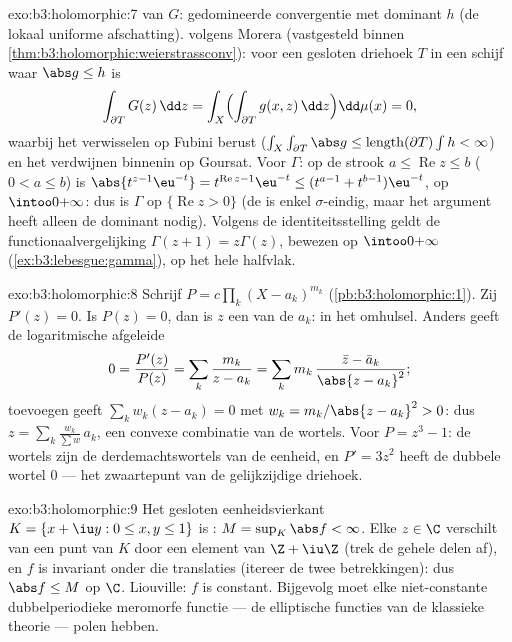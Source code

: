 \begin{solution}{exo:b3:holomorphic:7}
 van $G$: gedomineerde convergentie met dominant $h$
(de lokaal uniforme afschatting).  volgens Morera
(vastgesteld binnen
\cref{thm:b3:holomorphic:weierstrassconv}): voor een gesloten
driehoek $T$ in een schijf waar $\abs g \leq h$ is
\[
\int_{\partial T}G(z)\,\dd z =
\int_X\Bigl(\int_{\partial T}g(x, z)\,\dd z\Bigr)\dd\mu(x) =
0,
\]
waarbij het verwisselen op Fubini berust ($\int_X\int_{\partial
T}\abs g \leq \operatorname{length}(\partial T)\int h < \infty$)
en het verdwijnen binnenin op Goursat. Voor $\Gamma$: op de
strook $a \leq \operatorname{Re}z \leq b$ ($0 < a \leq b$) is
$\abs{t^{z-1}\eu^{-t}} = t^{\operatorname{Re}z-1}\eu^{-t} \leq
(t^{a-1} + t^{b-1})\eu^{-t}$,  op
$\intoo0{+\infty}$: dus is $\Gamma$  op
$\{\operatorname{Re} z > 0\}$ (de  is enkel $\sigma$-eindig,
maar het argument heeft alleen de  dominant nodig).
Volgens de identiteitsstelling geldt de functionaalvergelijking
$\Gamma(z + 1) = z\Gamma(z)$, bewezen op $\intoo0{+\infty}$
(\cref{ex:b3:lebesgue:gamma}), op het hele halfvlak.
\end{solution}

\begin{solution}{exo:b3:holomorphic:8}
Schrijf $P = c\prod_k(X - a_k)^{m_k}$
(\cref{pb:b3:holomorphic:1}). Zij $P'(z) = 0$. Is $P(z) = 0$, dan
is $z$ een van de $a_k$: in het omhulsel. Anders geeft de
logaritmische afgeleide
\[
0 = \frac{P'(z)}{P(z)} = \sum_k\frac{m_k}{z - a_k}
= \sum_k m_k\,\frac{\bar z - \bar a_k}{\abs{z - a_k}^2} ;
\]
toevoegen geeft $\sum_kw_k(z - a_k) = 0$ met $w_k = m_k/\abs{z -
a_k}^2 > 0$: dus $z = \sum_k\frac{w_k}{\sum w}\,a_k$, een convexe
combinatie van de wortels. Voor $P = z^3 - 1$: de wortels zijn de
derdemachtswortels van de eenheid, en $P' = 3z^2$ heeft de
dubbele wortel $0$ --- het zwaartepunt van de gelijkzijdige
driehoek.
\end{solution}

\begin{solution}{exo:b3:holomorphic:9}
Het gesloten eenheidsvierkant $K = \{x + \iu y : 0 \leq x, y \leq
1\}$ is : $M = \sup_K\abs f < \infty$. Elke $z \in \C$
verschilt van een punt van $K$ door een element van $\Z + \iu\Z$
(trek de gehele delen af), en $f$ is invariant onder die
translaties (itereer de twee betrekkingen): dus $\abs f \leq M$
op $\C$. Liouville: $f$ is constant. Bijgevolg moet elke
niet-constante dubbelperiodieke meromorfe functie --- de
elliptische functies van de klassieke theorie --- polen hebben.
\end{solution}

